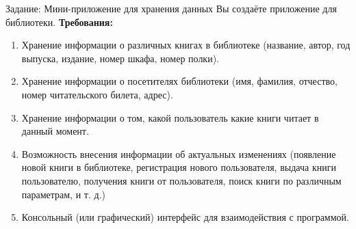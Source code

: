 \documentclass{beamer}
\begin{document}
\begin{frame}{Задание: Мини-приложение для хранения данных}
	Вы создаёте приложение для библиотеки.
	\newline
	\textbf{Требования:}
	\begin{enumerate}
		\item Хранение информации о различных книгах в библиотеке (название, автор, год выпуска, издание, номер шкафа, номер полки).
		\item Хранение информации о посетителях библиотеки (имя, фамилия, отчество, номер читательского билета, адрес).
		\item Хранение информации о том, какой пользователь какие книги читает в данный момент.
		\item Возможность внесения информации об актуальных изменениях (появление новой книги в библиотеке, регистрация нового пользователя, выдача книги пользователю, получения книги от пользователя, поиск книги по различным параметрам, и т. д.)
		\item Консольный (или графический) интерфейс для взаимодействия с программой.
	\end{enumerate}
\end{frame}
\end{document}
